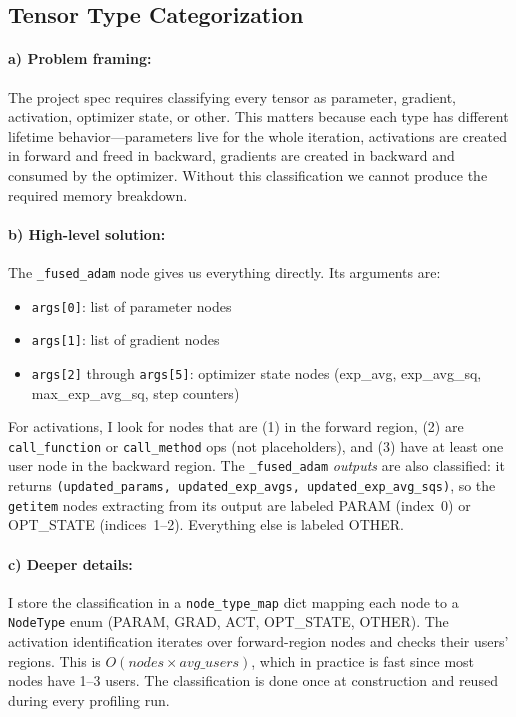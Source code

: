 \documentclass[11pt]{article}
\begin{document}
\subsection{Tensor Type Categorization}

\paragraph{a) Problem framing:} The project spec requires classifying every tensor as parameter, gradient, activation, optimizer state, or other. This matters because each type has different lifetime behavior---parameters live for the whole iteration, activations are created in forward and freed in backward, gradients are created in backward and consumed by the optimizer. Without this classification we cannot produce the required memory breakdown.

\paragraph{b) High-level solution:} The \texttt{\_fused\_adam} node gives us everything directly. Its arguments are:
\begin{itemize}
  \item \texttt{args[0]}: list of parameter nodes
  \item \texttt{args[1]}: list of gradient nodes
  \item \texttt{args[2]} through \texttt{args[5]}: optimizer state nodes (exp\_avg, exp\_avg\_sq, max\_exp\_avg\_sq, step counters)
\end{itemize}

For activations, I look for nodes that are (1) in the forward region, (2) are \texttt{call\_function} or \texttt{call\_method} ops (not placeholders), and (3) have at least one user node in the backward region. The \texttt{\_fused\_adam} \emph{outputs} are also classified: it returns \texttt{(updated\_params, updated\_exp\_avgs, updated\_exp\_avg\_sqs)}, so the \texttt{getitem} nodes extracting from its output are labeled PARAM (index~0) or OPT\_STATE (indices~1--2). Everything else is labeled OTHER.

\paragraph{c) Deeper details:} I store the classification in a \texttt{node\_type\_map} dict mapping each node to a \texttt{NodeType} enum (PARAM, GRAD, ACT, OPT\_STATE, OTHER). The activation identification iterates over forward-region nodes and checks their users' regions. This is $O(\textit{nodes} \times \textit{avg\_users})$, which in practice is fast since most nodes have 1--3 users. The classification is done once at construction and reused during every profiling run.
\end{document}
